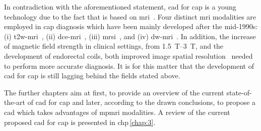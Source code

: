 In contradiction with the aforementioned statement, \ac{cad} for \ac{cap} is a young technology due to the fact that is based on \ac{mri}~\cite{Hegde2013}.
Four distinct \ac{mri} modalities are employed in \ac{cap} diagnosis which have been mainly developed after the mid-1990s: (i) \ac{t2w}-\ac{mri}~\cite{Hricak1983}, (ii) \ac{dce}-\ac{mri}~\cite{HuchBoni1995}, (iii) \ac{mrsi}~\cite{Kurhanewicz1996}, and (iv) \ac{dw}-\ac{mri}~\cite{Scheidler1999}.
In addition, the increase of magnetic field strength in clinical settings, from \SIrange{1.5}{3}{\tesla}, and the development of endorectal coils, both improved image spatial resolution~\cite{Swanson2001} needed to perform more accurate diagnosis.
It is for this matter that the development of \ac{cad} for \ac{cap} is still lagging behind the fields stated above.

The further chapters aim at first, to provide an overview of the current state-of-the-art of \ac{cad} for \ac{cap} and later, according to the drawn conclusions, to propose a \ac{cad} which takes advantages of \ac{mpmri} modalities. 
A review of the current proposed \ac{cad} for \ac{cap} is presented in \acs{chp}\,\ref{chap:3}.

 



